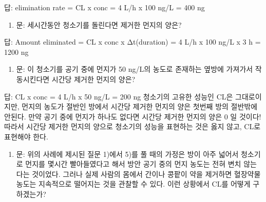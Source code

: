 \documentclass[
  11pt,
  krantz2, a4paper, twoside]{krantz}
\providecommand{\tightlist}{%
  \setlength{\itemsep}{0pt}\setlength{\parskip}{0pt}}
\renewenvironment{quote}{\begin{VF}}{\end{VF}}
\begin{document}
\begin{quote}
답: elimination rate = CL x conc = 4 L/h x 100 ng/L = 400 ng
\end{quote}

\begin{enumerate}
\def\labelenumi{\arabic{enumi})}
\setcounter{enumi}{3}
\tightlist
\item
  문: 세시간동안 청소기를 돌린다면 제거한 먼지의 양은?
\end{enumerate}

\begin{quote}
답: Amount eliminated = CL x conc x Δt(duration) = 4 L/h x 100 ng/L x
3 h = 1200 ng
\end{quote}

\begin{enumerate}
\def\labelenumi{\arabic{enumi})}
\setcounter{enumi}{4}
\tightlist
\item
  문: 이 청소기를 공기 중에 먼지가 50 ng/L의 농도로 존재하는 옆방에
  가져가서 작동시킨다면 시간당 제거한 먼지의 양은?
\end{enumerate}

\begin{quote}
답: CL x conc = 4 L/h x 50 ng/L = 200 ng 청소기의 고유한 성능인 CL은
그대로이지만, 먼지의 농도가 절반인 방에서 시간당 제거한 먼지의 양은
첫번째 방의 절반밖에 안된다. 만약 공기 중에 먼지가 하나도 없다면
시간당 제거한 먼지의 양은 0 일 것이다! 따라서 시간당 제거한 먼지의
양으로 청소기의 성능을 표현하는 것은 옳지 않고, CL로 표현해야 한다.
\end{quote}

\begin{enumerate}
\def\labelenumi{\arabic{enumi})}
\setcounter{enumi}{5}
\tightlist
\item
  문: 위의 사례에 제시된 질문 1)에서 5)를 풀 때의 가정은 방이 아주
  넓어서 청소기로 먼지를 몇시간 빨아들였다고 해서 방안 공기 중의 먼지
  농도는 전혀 변치 않는다는 것이었다. 그러나 실제 사람의 몸에서 간이나
  콩팥이 약을 제거하면 혈장약물농도는 지속적으로 떨어지는 것을 관찰할
  수 있다. 이런 상황에서 CL를 어떻게 구하겠는가?
\end{enumerate}
\end{document}
